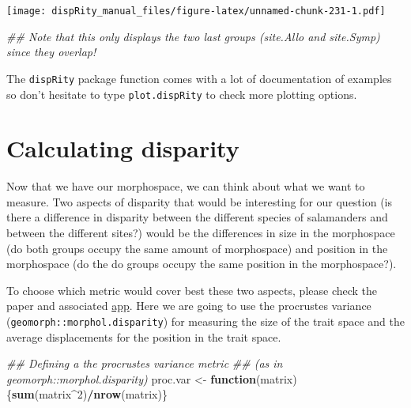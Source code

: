 \documentclass[
]{book}
\newenvironment{Shaded}{\begin{snugshade}}{\end{snugshade}}
\newcommand{\CommentTok}[1]{\textcolor[rgb]{0.56,0.35,0.01}{\textit{#1}}}
\newcommand{\ControlFlowTok}[1]{\textcolor[rgb]{0.13,0.29,0.53}{\textbf{#1}}}
\newcommand{\DecValTok}[1]{\textcolor[rgb]{0.00,0.00,0.81}{#1}}
\newcommand{\KeywordTok}[1]{\textcolor[rgb]{0.13,0.29,0.53}{\textbf{#1}}}
\newcommand{\NormalTok}[1]{#1}
\newcommand{\OperatorTok}[1]{\textcolor[rgb]{0.81,0.36,0.00}{\textbf{#1}}}
\newcommand{\StringTok}[1]{\textcolor[rgb]{0.31,0.60,0.02}{#1}}
\begin{document}
\texttt{[image: dispRity\_manual\_files/figure-latex/unnamed-chunk-231-1.pdf]}

\begin{Shaded}
\begin{Highlighting}[]
\CommentTok{\#\# Note that this only displays the two last groups (site.Allo and site.Symp) since they overlap!}
\end{Highlighting}
\end{Shaded}

The \texttt{dispRity} package function comes with a lot of documentation of examples so don't hesitate to type \texttt{plot.dispRity} to check more plotting options.

\hypertarget{calculating-disparity-2}{%
\section{Calculating disparity}\label{calculating-disparity-2}}

Now that we have our morphospace, we can think about what we want to measure.
Two aspects of disparity that would be interesting for our question (is there a difference in disparity between the different species of salamanders and between the different sites?) would be the differences in size in the morphospace (do both groups occupy the same amount of morphospace) and position in the morphospace (do the do groups occupy the same position in the morphospace?).

To choose which metric would cover best these two aspects, please check the \citet{moms} paper and associated \href{https://tguillerme.shinyapps.io/moms/}{app}. Here we are going to use the procrustes variance (\texttt{geomorph::morphol.disparity}) for measuring the size of the trait space and the average displacements \citep{moms} for the position in the trait space.

\begin{Shaded}
\begin{Highlighting}[]
\CommentTok{\#\# Defining a the procrustes variance metric}
\CommentTok{\#\# (as in geomorph::morphol.disparity)}
\NormalTok{proc.var \textless{}{-}}\StringTok{ }\ControlFlowTok{function}\NormalTok{(matrix) \{}\KeywordTok{sum}\NormalTok{(matrix}\OperatorTok{\^{}}\DecValTok{2}\NormalTok{)}\OperatorTok{/}\KeywordTok{nrow}\NormalTok{(matrix)\}}
\end{Highlighting}
\end{Shaded}
\end{document}
